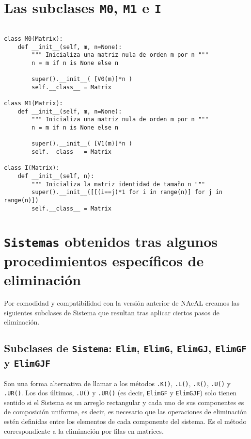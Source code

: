 \documentclass[11pt]{report}
\begin{document}
\chapter{Las subclases \texttt{M0}, \texttt{M1} e \texttt{I}}
\label{sec:org36bad8b}

\begin{verbatim}

class M0(Matrix):
    def __init__(self, m, n=None):
        """ Inicializa una matriz nula de orden m por n """
        n = m if n is None else n

        super().__init__( [V0(m)]*n )
        self.__class__ = Matrix

class M1(Matrix):
    def __init__(self, m, n=None):
        """ Inicializa una matriz nula de orden m por n """
        n = m if n is None else n

        super().__init__( [V1(m)]*n )
        self.__class__ = Matrix

class I(Matrix):
    def __init__(self, n):
        """ Inicializa la matriz identidad de tamaño n """
        super().__init__([[(i==j)*1 for i in range(n)] for j in range(n)])
        self.__class__ = Matrix

\end{verbatim}


\chapter{\texttt{Sistemas} obtenidos tras algunos procedimientos específicos de eliminación}
\label{sec:orgab385ed}

Por comodidad y compatibilidad con la versión anterior de NAcAL
creamos las siguientes subclases de Sistema que resultan tras aplicar
ciertos pasos de eliminación.

\section{Subclases de \texttt{Sistema}: \texttt{Elim}, \texttt{ElimG}, \texttt{ElimGJ},  \texttt{ElimGF} y  \texttt{ElimGJF}}
\label{sec:orge18b6a9}
Son una forma alternativa de llamar a los métodos \texttt{.K()}, \texttt{.L()},
\texttt{.R()}, \texttt{.U()} y \texttt{.UR()}. Los dos últimos, \texttt{.U()} y \texttt{.UR()} (es decir,
\texttt{ElimGF} y \texttt{ElimGJF}) solo tienen sentido si el Sistema es un arreglo
rectangular y cada uno de sus componentes es de composición uniforme,
es decir, es necesario que las operaciones de eliminación estén
definidas entre los elementos de cada componente del sistema. Es el
método correspondiente a la eliminación por filas en matrices.
\end{document}
